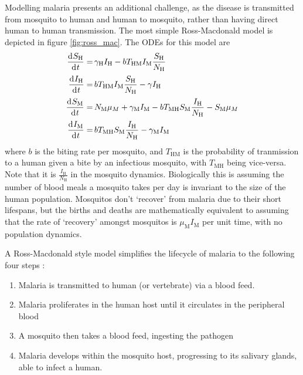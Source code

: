 Modelling malaria presents an additional challenge, as the disease is transmitted from mosquito to human and human to mosquito, rather than having direct human to human transmission. The most simple Ross-Macdonald model is depicted in figure \ref{fig:ross_mac}. The ODEs for this model are \begin{align*}
    \frac{\diff S_\mathrm{H}}{\diff t} = & \, \gamma_\mathrm{H}I_\mathrm{H} - bT_{\mathrm{HM}}I_\mathrm{M}\frac{S_\mathrm{H}}{N_\mathrm{H}}                                         \\
    \frac{\diff I_\mathrm{H}}{\diff t} = & \, bT_{\mathrm{HM}}I_\mathrm{M}\frac{S_\mathrm{H}}{N_\mathrm{H}} - \gamma I_\mathrm{H}                                                   \\
    \frac{\diff S_\mathrm{M}}{\diff t} = & \, N_\mathrm{M}\mu_M + \gamma_\mathrm{M}I_\mathrm{M} - bT_{\mathrm{MH}}S_\mathrm{M}\frac{I_\mathrm{H}}{N_\mathrm{H}} - S_\mathrm{M}\mu_M \\
    \frac{\diff I_\mathrm{M}}{\diff t} = & \, bT_{\mathrm{MH}}S_\mathrm{M}\frac{I_\mathrm{H}}{N_\mathrm{H}} - \gamma_\mathrm{M}I_\mathrm{M}
\end{align*} where $b$ is the biting rate per mosquito, and $T_{\mathrm{HM}}$ is the probability of tranmission to a human given a bite by an infectious mosquito, with $T_{\mathrm{MH}}$ being vice-versa. Note that it is $\frac{I_\mathrm{H}}{N_\mathrm{H}}$ in the mosquito dynamics. Biologically this is assuming the number of blood meals a mosquito takes per day is invariant to the size of the human population. Mosquitos don't `recover' from malaria due to their short lifespans, but the births and deaths are mathematically equivalent to assuming that the rate of `recovery' amongst mosquitos is $\mu_\mathrm{M}I_\mathrm{M}$ per unit time, with no population dynamics.

A Ross-Macdonald style model simplifies the lifecycle of malaria to the following four steps \parencite{smith_ross_2012}: \begin{enumerate}
    \item Malaria is transmitted to human (or vertebrate) via a blood feed.
    \item Malaria proliferates in the human host until it circulates in the peripheral blood
    \item A mosquito then takes a blood feed, ingesting the pathogen
    \item Malaria develops within the mosquito host, progressing to its salivary glands, able to infect a human.
\end{enumerate}

